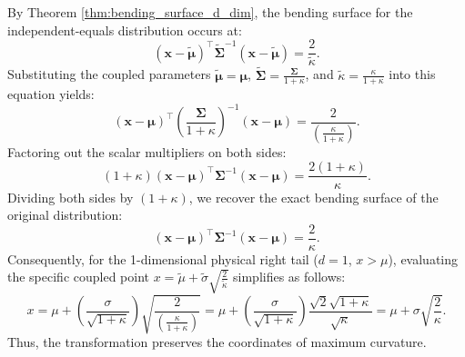 \documentclass[twoside,11pt]{article}
\renewenvironment{proof}{\par\noindent{\bf Proof\ }}{\hfill\BlackBox\par\vspace{2mm}}
\begin{document}
\begin{proof}
By Theorem \ref{thm:bending_surface_d_dim}, the bending surface for the independent-equals distribution occurs at:
\begin{equation}
    (\mathbf{x} - \tilde{\boldsymbol{\mu}})^\intercal \widetilde{\boldsymbol{\Sigma}}^{-1} (\mathbf{x} - \tilde{\boldsymbol{\mu}}) = \frac{2}{\tilde{\kappa}}.
\end{equation}
Substituting the coupled parameters $\tilde{\boldsymbol{\mu}} = \boldsymbol{\mu}$, $\widetilde{\boldsymbol{\Sigma}} = \frac{\boldsymbol{\Sigma}}{1+\kappa}$, and $\tilde{\kappa} = \frac{\kappa}{1+\kappa}$ into this equation yields:
\begin{equation}
    (\mathbf{x} - \boldsymbol{\mu})^\intercal \left( \frac{\boldsymbol{\Sigma}}{1+\kappa} \right)^{-1} (\mathbf{x} - \boldsymbol{\mu}) = \frac{2}{\left(\frac{\kappa}{1+\kappa}\right)}.
\end{equation}
Factoring out the scalar multipliers on both sides:
\begin{equation}
    (1+\kappa) (\mathbf{x} - \boldsymbol{\mu})^\intercal \boldsymbol{\Sigma}^{-1} (\mathbf{x} - \boldsymbol{\mu}) = \frac{2(1+\kappa)}{\kappa}.
\end{equation}
Dividing both sides by $(1+\kappa)$, we recover the exact bending surface of the original distribution:
\begin{equation}
    (\mathbf{x} - \boldsymbol{\mu})^\intercal \boldsymbol{\Sigma}^{-1} (\mathbf{x} - \boldsymbol{\mu}) = \frac{2}{\kappa}.
\end{equation}
Consequently, for the 1-dimensional physical right tail ($d=1$, $x > \mu$), evaluating the specific coupled point $x = \tilde{\mu} + \tilde{\sigma} \sqrt{\frac{2}{\tilde{\kappa}}}$ simplifies as follows:
\begin{equation}
    x = \mu + \left(\frac{\sigma}{\sqrt{1+\kappa}}\right) \sqrt{\frac{2}{\left(\frac{\kappa}{1+\kappa}\right)}} = \mu + \left(\frac{\sigma}{\sqrt{1+\kappa}}\right) \frac{\sqrt{2}\sqrt{1+\kappa}}{\sqrt{\kappa}} = \mu + \sigma \sqrt{\frac{2}{\kappa}}.
\end{equation}
Thus, the transformation preserves the coordinates of maximum curvature.
\end{proof}

{\raggedright
}
\end{document}
